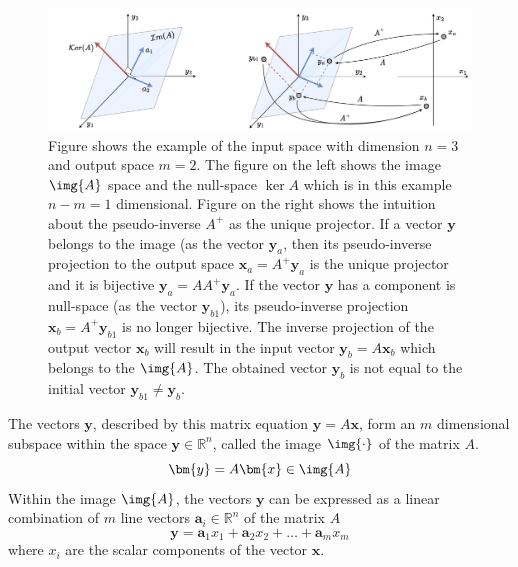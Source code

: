 \begin{figure}
    \centering
    \includegraphics[width=\linewidth]{Chapters/imgs/pseudo_inverse_intuition_aio.pdf}
    \caption{Figure shows the example of the input space with dimension $n=3$ and output space $m=2$. The figure on the left shows the image $\img{A}$ space and the null-space $\ker{A}$ which is in this example $n-m=1$ dimensional. Figure on the right shows the intuition about the pseudo-inverse $A^+$ as the unique projector. If a vector $\bm{y}$ belongs to the image (as the vector $\bm{y}_a$, then its pseudo-inverse projection to the output space $\bm{x}_a=A^+\bm{y}_a$ is the unique projector and it is bijective $\bm{y}_a = AA^+\bm{y}_a$. If the vector $\bm{y}$ has a component is null-space (as the vector $\bm{y}_{b1}$), its pseudo-inverse projection  $\bm{x}_b=A^+\bm{y}_{b1}$ is no longer bijective. The inverse projection of the output vector $\bm{x}_b$ will result in the input vector $\bm{y}_b=A\bm{x}_b$ which belongs to the $\img{A}$. The obtained vector $\bm{y}_b$ is not equal to the initial vector $\bm{y}_{b1}\neq \bm{y}_b$.}
    \label{fig:pseudoinverse_intuition}
\end{figure}

The vectors $\bm{y}$, described by this matrix equation $\bm{y} = A\bm{x}$, form an $m$ dimensional subspace within the space $\bm{y}\in\mathbb{R}^n$, called the image $\img{\cdot}$ of the matrix $A$. 
\begin{equation}
    \bm{y}=A\bm{x} \in \img{A}
\end{equation}
Within the image $\img{A}$, the vectors $\bm{y}$ can be expressed as a linear combination of $m$ line vectors $\bm{a}_i\in\mathbb{R}^n$ of the matrix $A$ \cite{LARSON2013}
\begin{equation}
    \bm{y} = \bm{a}_1x_1 +  \bm{a}_2x_2 + \ldots +  \bm{a}_mx_m
\end{equation}
where $x_i$ are the scalar components of the vector $\bm{x}$.


